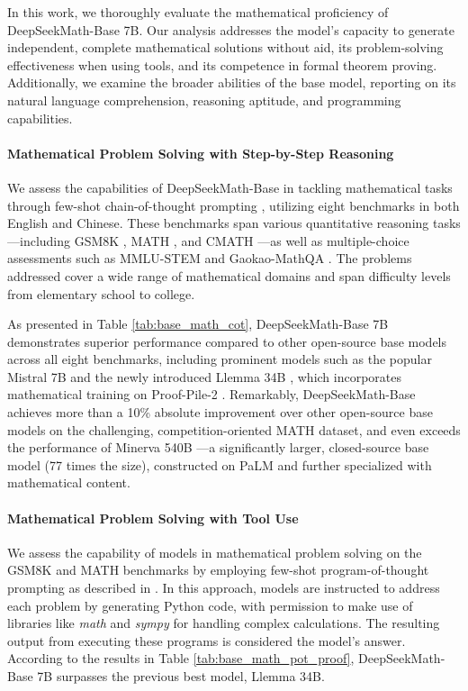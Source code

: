\begin{itemize}[topsep=0pt]
In this work, we thoroughly evaluate the mathematical proficiency of DeepSeekMath-Base 7B. Our analysis addresses the model's capacity to generate independent, complete mathematical solutions without aid, its problem-solving effectiveness when using tools, and its competence in formal theorem proving. Additionally, we examine the broader abilities of the base model, reporting on its natural language comprehension, reasoning aptitude, and programming capabilities.

\paragraph{Mathematical Problem Solving with Step-by-Step Reasoning}

We assess the capabilities of DeepSeekMath-Base in tackling mathematical tasks through few-shot chain-of-thought prompting \citep{cot}, utilizing eight benchmarks in both English and Chinese. These benchmarks span various quantitative reasoning tasks—including GSM8K \citep{gsm8k}, MATH \citep{MATH}, and CMATH \citep{wei2023cmath}—as well as multiple-choice assessments such as MMLU-STEM \citep{mmlu} and Gaokao-MathQA \citep{agieval}. The problems addressed cover a wide range of mathematical domains and span difficulty levels from elementary school to college.

As presented in Table \ref{tab:base_math_cot}, DeepSeekMath-Base 7B demonstrates superior performance compared to other open-source base models across all eight benchmarks, including prominent models such as the popular Mistral 7B \citep{mistral} and the newly introduced Llemma 34B \citep{llemma}, which incorporates mathematical training on Proof-Pile-2 \citep{llemma}. Remarkably, DeepSeekMath-Base achieves more than a 10\% absolute improvement over other open-source base models on the challenging, competition-oriented MATH dataset, and even exceeds the performance of Minerva 540B \citep{minerva}—a significantly larger, closed-source base model (77 times the size), constructed on PaLM \citep{palm} and further specialized with mathematical content.

\paragraph{Mathematical Problem Solving with Tool Use} We assess the capability of models in mathematical problem solving on the GSM8K and MATH benchmarks by employing few-shot program-of-thought prompting as described in \citep{pot,pal}. In this approach, models are instructed to address each problem by generating Python code, with permission to make use of libraries like \textit{math} and \textit{sympy} for handling complex calculations. The resulting output from executing these programs is considered the model's answer. According to the results in Table \ref{tab:base_math_pot_proof}, DeepSeekMath-Base 7B surpasses the previous best model, Llemma 34B.


\end{itemize}
